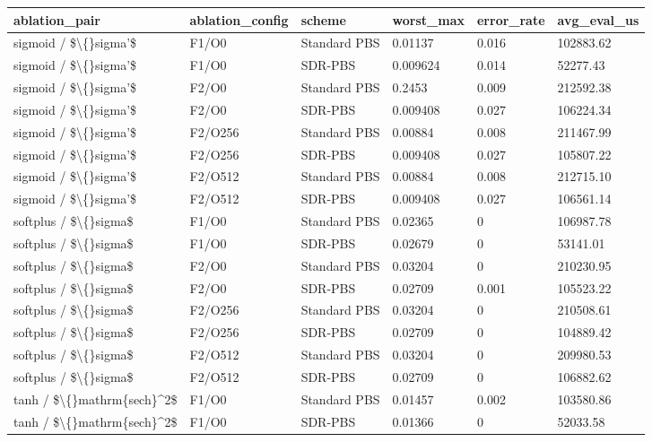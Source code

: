 \small
\setlength{\tabcolsep}{4pt}
\begin{tabular}{llllll}
\toprule
ablation\_pair & ablation\_config & scheme & worst\_max & error\_rate & avg\_eval\_us \\
\midrule
sigmoid / \$\textbackslash\{\}sigma'\$ & F1/O0 & Standard PBS & 0.01137 & 0.016 & 102883.62 \\
sigmoid / \$\textbackslash\{\}sigma'\$ & F1/O0 & SDR-PBS & 0.009624 & 0.014 & 52277.43 \\
sigmoid / \$\textbackslash\{\}sigma'\$ & F2/O0 & Standard PBS & 0.2453 & 0.009 & 212592.38 \\
sigmoid / \$\textbackslash\{\}sigma'\$ & F2/O0 & SDR-PBS & 0.009408 & 0.027 & 106224.34 \\
sigmoid / \$\textbackslash\{\}sigma'\$ & F2/O256 & Standard PBS & 0.00884 & 0.008 & 211467.99 \\
sigmoid / \$\textbackslash\{\}sigma'\$ & F2/O256 & SDR-PBS & 0.009408 & 0.027 & 105807.22 \\
sigmoid / \$\textbackslash\{\}sigma'\$ & F2/O512 & Standard PBS & 0.00884 & 0.008 & 212715.10 \\
sigmoid / \$\textbackslash\{\}sigma'\$ & F2/O512 & SDR-PBS & 0.009408 & 0.027 & 106561.14 \\
softplus / \$\textbackslash\{\}sigma\$ & F1/O0 & Standard PBS & 0.02365 & 0 & 106987.78 \\
softplus / \$\textbackslash\{\}sigma\$ & F1/O0 & SDR-PBS & 0.02679 & 0 & 53141.01 \\
softplus / \$\textbackslash\{\}sigma\$ & F2/O0 & Standard PBS & 0.03204 & 0 & 210230.95 \\
softplus / \$\textbackslash\{\}sigma\$ & F2/O0 & SDR-PBS & 0.02709 & 0.001 & 105523.22 \\
softplus / \$\textbackslash\{\}sigma\$ & F2/O256 & Standard PBS & 0.03204 & 0 & 210508.61 \\
softplus / \$\textbackslash\{\}sigma\$ & F2/O256 & SDR-PBS & 0.02709 & 0 & 104889.42 \\
softplus / \$\textbackslash\{\}sigma\$ & F2/O512 & Standard PBS & 0.03204 & 0 & 209980.53 \\
softplus / \$\textbackslash\{\}sigma\$ & F2/O512 & SDR-PBS & 0.02709 & 0 & 106882.62 \\
tanh / \$\textbackslash\{\}mathrm\{sech\}^2\$ & F1/O0 & Standard PBS & 0.01457 & 0.002 & 103580.86 \\
tanh / \$\textbackslash\{\}mathrm\{sech\}^2\$ & F1/O0 & SDR-PBS & 0.01366 & 0 & 52033.58 \\

\end{tabular}
